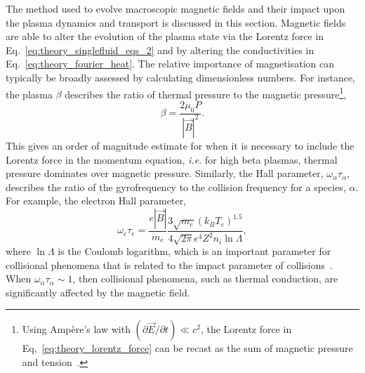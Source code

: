 The method used to evolve macroscopic magnetic fields and their impact upon the plasma dynamics and transport is discussed in this section.
Magnetic fields are able to alter the evolution of the plasma state via the Lorentz force in Eq.~\ref{eq:theory_singlefluid_eqs_2} and by altering the conductivities in Eq.~\ref{eq:theory_fourier_heat}.
The relative importance of magnetisation can typically be broadly assessed by calculating dimensionless numbers.
For instance, the plasma $\beta$ describes the ratio of thermal pressure to the magnetic pressure\footnote{Using Amp\`ere's law with $(\partial \vec{E} / \partial t) \ll c^2$, the Lorentz force in Eq,~\ref{eq:theory_lorentz_force} can be recast as the sum of magnetic pressure and tension~\cite{oneill_modelling_2023}.},
\begin{equation}
    \beta = \frac{2 \mu_0 P}{|\vec{B}|^2}.
\end{equation}
This gives an order of magnitude estimate for when it is necessary to include the Lorentz force in the momentum equation, \textit{i.e.} for high beta plasmas, thermal pressure dominates over magnetic pressure.
Similarly, the Hall parameter, $\omega_\alpha \tau_\alpha$, describes the ratio of the gyrofrequency to the collision frequency for a species, $\alpha$.
For example, the electron Hall parameter,
\begin{equation}
    \omega_e \tau_e = \frac{e |\vec{B}|}{m_e} \frac{3\sqrt{m_e} (k_B T_e)^{1.5}}{4 \sqrt{2\pi} e^4 Z^2 n_i \ln \Lambda },
\end{equation}
where $\ln\Lambda$ is the Coulomb logarithm, which is an important parameter for collisional phenomena that is related to the impact parameter of collisions~\cite{ramazanov_coulomb_2001,kodanova_investigation_2015,lin_temperature_2023}.
When $\omega_\alpha \tau_\alpha \sim 1$, then collisional phenomena, such as thermal conduction, are significantly affected by the magnetic field.

